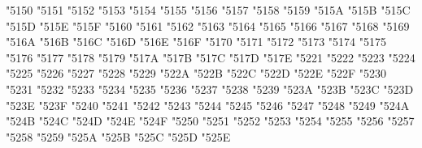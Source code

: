 {\Uchar\jis"5150 %
\Uchar\jis"5151 %
\Uchar\jis"5152 %
\Uchar\jis"5153 %
\Uchar\jis"5154 %
\Uchar\jis"5155 %
\Uchar\jis"5156 %
\Uchar\jis"5157 %
\Uchar\jis"5158 %
\Uchar\jis"5159 %
\Uchar\jis"515A %
\Uchar\jis"515B %
\Uchar\jis"515C %
\Uchar\jis"515D %
\Uchar\jis"515E %
\Uchar\jis"515F %
\Uchar\jis"5160 %
\Uchar\jis"5161 %
\Uchar\jis"5162 %
\Uchar\jis"5163 %
\Uchar\jis"5164 %
\Uchar\jis"5165 %
\Uchar\jis"5166 %
\Uchar\jis"5167 %
\Uchar\jis"5168 %
\Uchar\jis"5169 %
\Uchar\jis"516A %
\Uchar\jis"516B %
\Uchar\jis"516C %
\Uchar\jis"516D %
\Uchar\jis"516E %
\Uchar\jis"516F %
\Uchar\jis"5170 %
\Uchar\jis"5171 %
\Uchar\jis"5172 %
\Uchar\jis"5173 %
\Uchar\jis"5174 %
\Uchar\jis"5175 %
\Uchar\jis"5176 %
\Uchar\jis"5177 %
\Uchar\jis"5178 %
\Uchar\jis"5179 %
\Uchar\jis"517A %
\Uchar\jis"517B %
\Uchar\jis"517C %
\Uchar\jis"517D %
\Uchar\jis"517E %
\Uchar\jis"5221 %
\Uchar\jis"5222 %
\Uchar\jis"5223 %
\Uchar\jis"5224 %
\Uchar\jis"5225 %
\Uchar\jis"5226 %
\Uchar\jis"5227 %
\Uchar\jis"5228 %
\Uchar\jis"5229 %
\Uchar\jis"522A %
\Uchar\jis"522B %
\Uchar\jis"522C %
\Uchar\jis"522D %
\Uchar\jis"522E %
\Uchar\jis"522F %
\Uchar\jis"5230 %
\Uchar\jis"5231 %
\Uchar\jis"5232 %
\Uchar\jis"5233 %
\Uchar\jis"5234 %
\Uchar\jis"5235 %
\Uchar\jis"5236 %
\Uchar\jis"5237 %
\Uchar\jis"5238 %
\Uchar\jis"5239 %
\Uchar\jis"523A %
\Uchar\jis"523B %
\Uchar\jis"523C %
\Uchar\jis"523D %
\Uchar\jis"523E %
\Uchar\jis"523F %
\Uchar\jis"5240 %
\Uchar\jis"5241 %
\Uchar\jis"5242 %
\Uchar\jis"5243 %
\Uchar\jis"5244 %
\Uchar\jis"5245 %
\Uchar\jis"5246 %
\Uchar\jis"5247 %
\Uchar\jis"5248 %
\Uchar\jis"5249 %
\Uchar\jis"524A %
\Uchar\jis"524B %
\Uchar\jis"524C %
\Uchar\jis"524D %
\Uchar\jis"524E %
\Uchar\jis"524F %
\Uchar\jis"5250 %
\Uchar\jis"5251 %
\Uchar\jis"5252 %
\Uchar\jis"5253 %
\Uchar\jis"5254 %
\Uchar\jis"5255 %
\Uchar\jis"5256 %
\Uchar\jis"5257 %
\Uchar\jis"5258 %
\Uchar\jis"5259 %
\Uchar\jis"525A %
\Uchar\jis"525B %
\Uchar\jis"525C %
\Uchar\jis"525D %
\Uchar\jis"525E %
}
